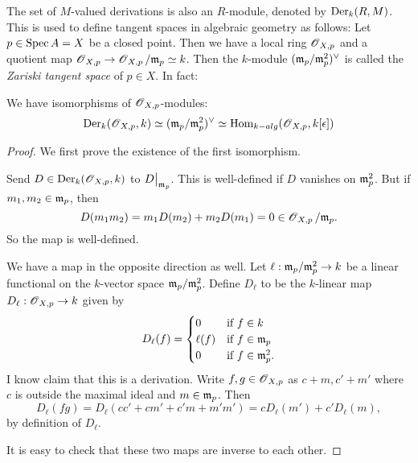 \documentclass[11pt, english]{article}
\begin{document}
The set of $M$-valued derivations is also an $R$-module, denoted by $\operatorname{Der}_k(R,M)$. This is used to define tangent spaces in algebraic geometry as follows: Let $p \in \operatorname{Spec} A=X$ be a closed point. Then we have a local ring $\operatorname{\mathscr{O}}_{X,p}$ and a quotient map $\operatorname{\mathscr{O}}_{X,p} \to \operatorname{\mathscr{O}}_{X,p}/\mathfrak{m}_p \simeq  k$. Then the $k$-module $(\mathfrak{m}_p/\mathfrak{m}_p^2)^\vee$ is called the \emph{Zariski tangent space} of $p \in X$. In fact:
\begin{prop}
\label{propzariski}
We have isomorphisms of $\operatorname{\mathscr{O}}_{X,p}$-modules:
$$
\operatorname{Der}_k(\operatorname{\mathscr{O}}_{X,p},k) \simeq (\mathfrak{m}_p/\mathfrak{m}_p^2)^\vee \simeq \operatorname{Hom}_{k-alg}(\operatorname{\mathscr{O}}_{X,p},k[\epsilon])
$$
\end{prop}
\begin{proof}

We first prove the existence of the first isomorphism.

Send $D \in \operatorname{Der}_k(\operatorname{\mathscr{O}}_{X,p},k)$ to $\restr{D}{\mm_p}$. This is well-defined if $D$ vanishes on $\mathfrak{m}_p^2$. But if $m_1,m_2 \in \mathfrak{m}_p$, then $$D(m_1m_2)=m_1D(m_2)+m_2D(m_1)=0 \in \operatorname{\mathscr{O}}_{X,p}/\mathfrak{m}_p.$$
So the map is well-defined.

We have a map in the opposite direction as well. Let $\ell:\mathfrak{m}_p/\mathfrak{m}_p^2 \to k$ be a linear functional on the $k$-vector space $\mathfrak{m}_p/\mathfrak{m}_p^2$. Define $D_\ell$ to be the $k$-linear map $D_\ell:\operatorname{\mathscr{O}}_{X,p} \to k$ given by
$$
D_\ell(f) = \begin{cases}
0 & \text{if $f \in k$} \\
\ell(f) & \text{if $f \in \mathfrak{m}_p$} \\
0 & \text{if $f \in \mathfrak{m}_p^2$}.
\end{cases}
$$
I know claim that this is a derivation. Write $f,g \in \operatorname{\mathscr{O}}_{X,p}$ as $c+m,c'+m'$ where $c$ is outside the maximal ideal and $m \in \mathfrak{m}_p$. Then
$$
D_\ell(fg)=D_\ell(cc'+cm'+c'm+m'm') = cD_\ell(m')+c'D_\ell(m),
$$
by definition of $D_\ell$.

It is easy to check that these two maps are inverse to each other.


\end{proof}
\end{document}

